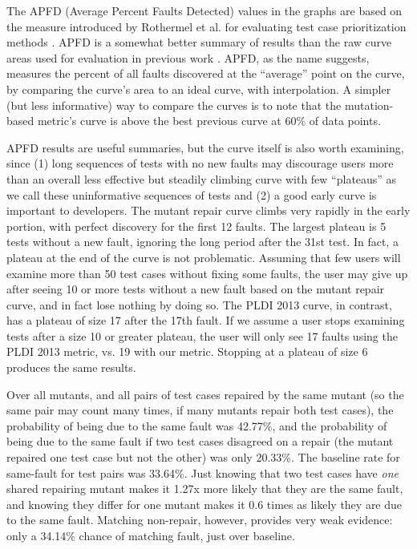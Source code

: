 The APFD (Average Percent Faults Detected) values in the graphs are based on the measure  introduced by Rothermel et al. for evaluating test case prioritization methods \cite{APFD}.  APFD is a somewhat better summary of results than the raw curve areas used for evaluation in previous work \cite{PLDI13}.  APFD, as the name suggests, measures the percent of all faults discovered at the ``average'' point on the curve, by comparing the curve's area to an ideal curve, with interpolation.  A simpler (but less informative) way to compare the curves is to note that the mutation-based metric's curve is above the best previous curve at 60\% of data points.

APFD results are useful summaries, but the curve itself is also worth examining, since (1) long sequences of tests with no new faults may discourage users more than an overall less effective but steadily climbing curve with few ``plateaus'' as we call these uninformative sequences of tests and (2) a good early curve is important to developers.  The mutant repair curve climbs very rapidly in the early portion, with perfect discovery for the first 12 faults. The largest plateau is 5 tests without a new fault, ignoring the long period after the 31st test.  In fact, a plateau at the end of the curve is not problematic.  Assuming that few users will examine more than 50 test cases without fixing some faults, the user may give up after seeing 10 or more tests without a new fault based on the mutant repair curve, and in fact lose nothing by doing so.  The PLDI 2013 curve, in contrast, has a plateau of size 17 after the 17th fault.  If we assume a user stops examining tests after a size 10 or greater plateau, the user will only see 17 faults using the PLDI 2013 metric, vs. 19 with our metric.  Stopping at a plateau of size 6 produces the same results.

Over all mutants, and all pairs of test cases repaired by the same mutant (so the same pair may count many times, if many mutants repair both test cases), the probability of being due to the same fault was 42.77\%, and the probability of being due to the same fault if two test cases disagreed on a repair (the mutant repaired one test case but not the other) was only 20.33\%.  The baseline rate for same-fault for test pairs was 33.64\%.  Just knowing that two test cases have \emph{one} shared repairing mutant makes it 1.27x more likely that they are the same fault, and knowing they differ for one mutant makes it 0.6 times as likely they are due to the same fault.  Matching non-repair, however, provides very weak evidence:  only a 34.14\% chance of matching fault, just over baseline.

